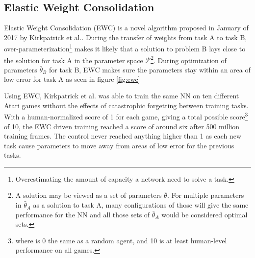 \subsection{Elastic Weight Consolidation}
Elastic Weight Consolidation (EWC) is a novel algorithm proposed in January of 2017 by Kirkpatrick et al.\cite{ewc}. During the transfer of weights from task A to task B, over-parameterization\footnote{Overestimating the amount of capacity a network need to solve a task.} makes it likely that a solution to problem B lays close to the solution for task A in the parameter space \(\mathcal{P}\)\footnote{A solution may be viewed as a set of parameters \(\bar{\theta}\). For multiple parameters in \(\bar{\theta}_{A}\) as a solution to task A, many configurations of those will give the same performance for the NN and all those sets of \(\bar{\theta}_{A}\) would be considered optimal sets.}. During optimization of parameters \(\bar{\theta}_{B}\) for task B, EWC makes sure the parameters stay within an area of low error for task A as seen in figure \ref{fig:ewc}

Using EWC, Kirkpatrick et al.\cite{ewc} was able to train the same NN on ten different Atari games without the effects of catastrophic forgetting between training tasks. With a human-normalized score of 1 for each game, giving a total possible score\footnote{where is 0 the same as a random agent, and 10 is at least human-level performance on all games.} of 10, the EWC driven training reached a score of around six after 500 million training frames. The control never reached anything higher than 1 as each new task cause parameters to move away from areas of low error for the previous tasks.

